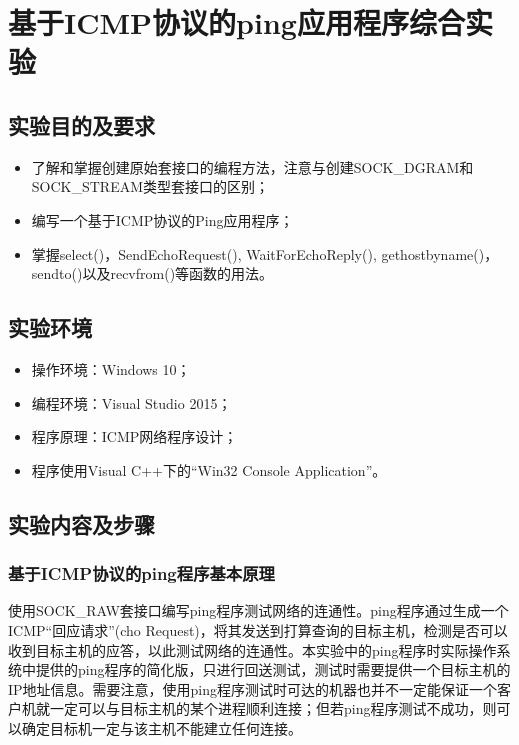 \documentclass[a4paper]{ctexrep}
\begin{document}
\chapter{基于ICMP协议的ping应用程序综合实验}
\begin{spacing}{1.5}
\songti{}
\section{实验目的及要求}
\begin{itemize}
	\item 了解和掌握创建原始套接口的编程方法，注意与创建SOCK\_DGRAM和SOCK\_STREAM类型套接口的区别；
	\item 编写一个基于ICMP协议的Ping应用程序；
	\item 掌握select()，SendEchoRequest(), WaitForEchoReply(), gethostbyname()，sendto()以及recvfrom()等函数的用法。
\end{itemize}
\section{实验环境}
\begin{itemize}
	\item 操作环境：Windows 10；
	\item 编程环境：Visual Studio 2015；
	\item 程序原理：ICMP网络程序设计；
	\item 程序使用Visual C++下的“Win32 Console Application”。
\end{itemize}
\section{实验内容及步骤}
\subsection{基于ICMP协议的ping程序基本原理}
使用SOCK\_RAW套接口编写ping程序测试网络的连通性。ping程序通过生成一个ICMP“回应请求”(cho Request)，将其发送到打算查询的目标主机，检测是否可以收到目标主机的应答，以此测试网络的连通性。本实验中的ping程序时实际操作系统中提供的ping程序的简化版，只进行回送测试，测试时需要提供一个目标主机的IP地址信息。需要注意，使用ping程序测试时可达的机器也并不一定能保证一个客户机就一定可以与目标主机的某个进程顺利连接；但若ping程序测试不成功，则可以确定目标机一定与该主机不能建立任何连接。


\end{spacing}
\end{document}
